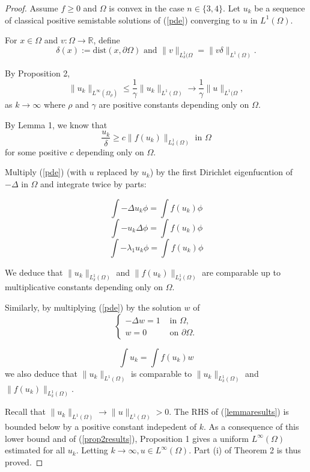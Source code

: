 \documentclass[paper=a4, fontsize=11pt]{scrartcl} %
\numberwithin{equation}{section} %
\numberwithin{figure}{section} %
\numberwithin{table}{section} %
\numberwithin{exercise}{section}
\begin{document}
\begin{proof}
Assume $f\geq 0$ and $\Omega$ is convex in the case $n\in\{3,4\}$. Let $u_k$ be a sequence of classical positive semistable solutions of (\ref{pde}) converging to $u$ in $L^1(\Omega)$.

For $x\in \Omega$ and $v\colon\Omega\to \mathbb{R}$, define
$$\delta(x):=\mathrm{dist}(x,\partial \Omega) \mbox{ and } \|v\|_{L_{\delta}^1(\Omega}=\|v\delta\|_{L^1(\Omega)}.$$

By Proposition 2, 
\begin{equation}\label{prop2results}
\|u_k\|_{L^{\infty}(\Omega_\rho)}\leq \frac{1}{\gamma} \|u_k\|_{L^1(\Omega)} \to \frac{1}{\gamma}\|u\|_{L^1(\Omega},
\end{equation}
as $k\to\infty$ where $\rho$ and $\gamma$ are positive constants depending only on $\Omega$.

By Lemma 1, we know that 
\begin{equation}\label{lemmaresults}
\frac{u_k}{\delta}\geq c\|f(u_k)\|_{L_{\delta}^1(\Omega)}  \mbox{ in } \Omega
\end{equation}
for some positive $c$ depending only on $\Omega$.

Multiply (\ref{pde}) (with $u$ replaced by $u_k$) by the first Dirichlet eigenfucntion of $-\Delta$ in $\Omega$ and integrate twice by parts:

$$\int -\Delta u_k \phi =\int f(u_k) \phi$$
$$\int -u_k\Delta \phi =\int f(u_k) \phi$$
$$\int -\lambda_1 u_k\phi =\int f(u_k) \phi$$

We deduce that $\|u_k\|_{L_{\delta}^1(\Omega)}$ and $\|f(u_k)\|_{L_{\delta}^1(\Omega)}$ are comparable up to multiplicative constants depending only on $\Omega$.

Similarly, by multiplying (\ref{pde}) by the solution $w$ of 
$$\begin{cases} -\Delta w=1 &\mbox{ in } \Omega,\\
w=0  &\mbox{ on } \partial \Omega .\end{cases}$$

\begin{equation}\label{w}
\int u_k=\int f(u_k) w
\end{equation}
we also deduce that $\|u_k\|_{L^1(\Omega)}$ is comparable to $\|u_k\|_{L_{\delta}^1(\Omega)}$ and $\|f(u_k)\|_{L_{\delta}^1(\Omega)}$.

Recall that $\|u_k\|_{L^1(\Omega)}\to \|u\|_{L^1(\Omega)}>0.$ The RHS of (\ref{lemmaresults}) is bounded below by a positive constant indepedent of $k$.
As a consequence of this lower bound and of (\ref{prop2results}), Proposition 1 gives a uniform $L^\infty(\Omega)$ estimated for all $u_k$. Letting $k\to\infty, u\in L^{\infty}(\Omega)$. Part (i) of Theorem 2 is thus proved.


\end{proof}
\end{document}
